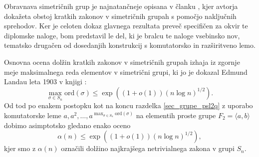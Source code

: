 Obravnava simetričnih grup je najnatančneje opisana v članku \cite{Kozma_Thom_2016}, kjer avtorja dokažeta obstoj kratkih zakonov v simetričnih grupah s pomočjo naključnih sprehodov.
Ker je celoten dokaz glavnega rezultata preveč specifičen za okvir te diplomske naloge, bom predstavil le del, ki je bralcu te naloge vsebinsko nov, tematsko drugačen od dosedanjih konstrukcij s komutatorsko in razširitveno lemo.

Osnovna ocena dolžin kratkih zakonov v simetričnih grupah izhaja iz zgornje meje maksimalnega reda elementov v simetrični grupi,
ki jo je dokazal Edmund Landau leta 1903 v knjigi \cite{Landau_1903}: \begin{equation*}
\max_{\sigma \in S_n} \text{ord}(\sigma) \le \exp((1 + o(1)) (n \log n)^{1 / 2}).
\end{equation*}  
Od tod po enakem postopku kot na koncu razdelka \ref{sec_grupe_psl2q} z uporabo komutatorske leme $a, a^2, \ldots, a^{\max_{\sigma \in S_n} \text{ord}(\sigma)}$ na elementih proste grupe $F_2 = \langle a, b \rangle$ dobimo asimptotsko gledano enako oceno \begin{equation*}
    \alpha(n)  \le \exp((1 + o(1)) (n \log n)^{1 / 2}),
\end{equation*}  
kjer smo z $\alpha(n)$ označili dolžino najkrajšega netrivialnega zakona v grupi $S_n$.

